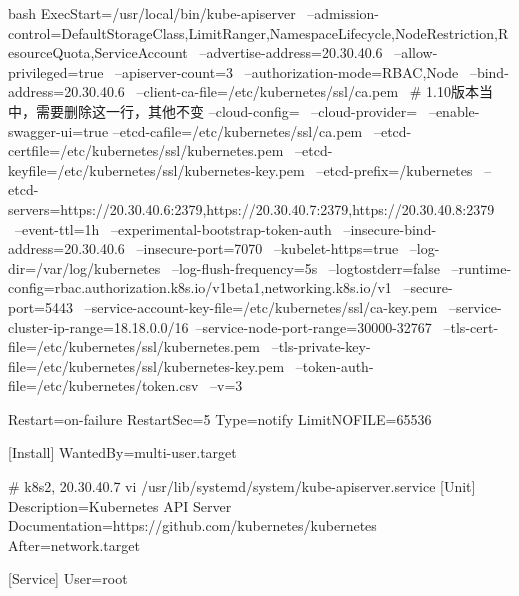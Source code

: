 \begin{outline}[enumerate]
\begin{code-block}{bash}
ExecStart=/usr/local/bin/kube-apiserver \
    --admission-control=DefaultStorageClass,LimitRanger,NamespaceLifecycle,NodeRestriction,ResourceQuota,ServiceAccount \
    --advertise-address=20.30.40.6 \
    --allow-privileged=true \
    --apiserver-count=3 \
    --authorization-mode=RBAC,Node \
    --bind-address=20.30.40.6 \
    --client-ca-file=/etc/kubernetes/ssl/ca.pem \ # 1.10版本当中，需要删除这一行，其他不变
    --cloud-config= \
    --cloud-provider= \
    --enable-swagger-ui=true --etcd-cafile=/etc/kubernetes/ssl/ca.pem \
    --etcd-certfile=/etc/kubernetes/ssl/kubernetes.pem \
    --etcd-keyfile=/etc/kubernetes/ssl/kubernetes-key.pem \
    --etcd-prefix=/kubernetes \
    --etcd-servers=https://20.30.40.6:2379,https://20.30.40.7:2379,https://20.30.40.8:2379 \
    --event-ttl=1h \
    --experimental-bootstrap-token-auth \
    --insecure-bind-address=20.30.40.6 \
    --insecure-port=7070 \
    --kubelet-https=true \
    --log-dir=/var/log/kubernetes \
    --log-flush-frequency=5s \
    --logtostderr=false \
    --runtime-config=rbac.authorization.k8s.io/v1beta1,networking.k8s.io/v1 \
    --secure-port=5443 \
    --service-account-key-file=/etc/kubernetes/ssl/ca-key.pem \
    --service-cluster-ip-range=18.18.0.0/16\
    --service-node-port-range=30000-32767 \
    --tls-cert-file=/etc/kubernetes/ssl/kubernetes.pem \
    --tls-private-key-file=/etc/kubernetes/ssl/kubernetes-key.pem \
    --token-auth-file=/etc/kubernetes/token.csv \
    --v=3

Restart=on-failure
RestartSec=5
Type=notify
LimitNOFILE=65536

[Install]
WantedBy=multi-user.target


# k8s2, 20.30.40.7
vi /usr/lib/systemd/system/kube-apiserver.service
[Unit]
Description=Kubernetes API Server
Documentation=https://github.com/kubernetes/kubernetes
After=network.target

[Service]
User=root


\end{code-block}
\end{outline}
